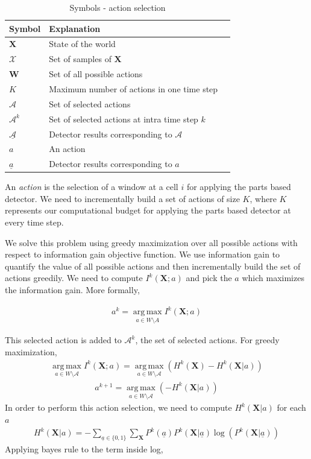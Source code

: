\documentclass[10pt,twocolumn,letterpaper]{article}
\begin{document}
\begin{table}[ht]
  \begin{tabular}{lll}
   \hline
   Symbol & Explanation \\
   \hline
$\textbf{X} $ & State of the world\\
 $\mathcal{X} $ & Set of samples of $\textbf{X}$ \\
 $\textbf{W} $ & Set of all possible actions\\
 $K$ & Maximum number of actions in one time step\\
 $\mathcal{A} $ & Set of selected actions\\
 $\mathcal{A}^{k} $ & Set of selected actions at intra time step $k$\\
 $\underline{\mathcal{A}} $ & Detector results corresponding to $\mathcal{A}$\\
 $a $ & An action\\
 $ \underline{a} $ & Detector results corresponding to $ a$\\
   \hline
  \end{tabular}
  \caption{
    Symbols - action selection
  }
  \label{tab:Symbols in action selection}
\end{table}

An \textit{action} is the selection of a window at a cell $i$ for applying the parts based detector. We need to incrementally build a set of actions of size $ K $, where $ K $ represents our computational budget for applying the parts based detector at every time step. 

We solve this problem using greedy maximization over all possible actions with respect to information gain objective function. We use information gain to quantify the value of all possible actions and then incrementally build the set of actions greedily.
We need to compute $I^{k}(\textbf{X};a)$ and pick the $a$ which maximizes the information gain. More formally,

\begin{align}
a^{k} = \operatorname*{arg\,max}_{a\in W \setminus A} I^{k}(\textbf{X};a)
\end{align}

This selected action is added to $\mathcal{A}^{k}$, the set of selected actions.
For greedy maximization,
\begin{align}
\operatorname*{arg\,max}_{a\in W \setminus{\mathcal{A}}}I^{k}(\textbf{X}; a) =\operatorname*{arg\,max}_{a\in W \setminus{\mathcal{A}}} (H^{k}(\textbf{X}) - H^{k}(\textbf{X}|a))
\end{align}
\begin{align}
a^{k+1} =\operatorname*{arg\,max}_{a\in W \setminus{\mathcal{A}}} (- H^{k}(\textbf{X}|a))
\end{align}
In order to perform this action selection, we need to compute $H^{k}(\textbf{X}|a)$ for each $a$
\begin{align}
H^{k}(\textbf{X}| a) = -\sum_{\underline{a}\in\lbrace 0 ,1 \rbrace} \sum_{\textbf{X}} P^{k}(\underline{a})P^{k}(\textbf{X}| \underline{a}) \log(P^{k}(\textbf{X}| \underline{a}))
\end{align}
Applying bayes rule to the term inside log,
\end{document}
